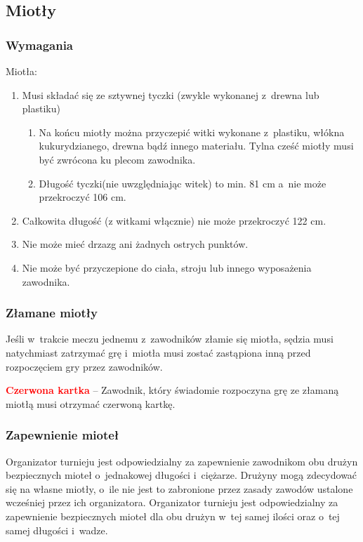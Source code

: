 \documentclass[12pt]{article}
\newcommand\redcard[1]{\bgroup\textcolor{red}{\textbf{#1}}}
\begin{document}
\subsection{Miotły}

\subsubsection{Wymagania}
Miotła:

\begin{enumerate}
	\item
	      Musi składać się ze sztywnej tyczki (zwykle wykonanej z~drewna lub
	      plastiku)

	      \begin{enumerate}
		      \item
		            Na końcu miotły można przyczepić witki wykonane z~plastiku, włókna
		            kukurydzianego, drewna bądź innego materiału. Tylna cześć miotły
		            musi być zwrócona ku plecom zawodnika.
		      \item
		            Długość tyczki(nie uwzględniając witek) to min. 81 cm a~nie może
		            przekroczyć 106 cm.
	      \end{enumerate}
	\item
	      Całkowita długość (z witkami włącznie) nie może przekroczyć 122 cm.
	\item
	      Nie może mieć drzazg ani żadnych ostrych punktów.
	\item
	      Nie może być przyczepione do ciała, stroju lub innego wyposażenia
	      zawodnika.
\end{enumerate}

\subsubsection{Złamane miotły}
Jeśli w~trakcie meczu jednemu z~zawodników złamie się miotła, sędzia musi natychmiast zatrzymać grę i~miotła musi zostać zastąpiona inną przed rozpoczęciem gry przez
zawodników.

\redcard{Czerwona kartka} -- Zawodnik, który świadomie rozpoczyna grę ze
złamaną miotłą musi otrzymać czerwoną kartkę.

\subsubsection{Zapewnienie mioteł}
Organizator turnieju jest odpowiedzialny za zapewnienie zawodnikom obu
drużyn bezpiecznych mioteł o~jednakowej długości i~ciężarze. Drużyny
mogą zdecydować się na własne miotły, o~ile nie jest to zabronione przez
zasady zawodów ustalone wcześniej przez ich organizatora. Organizator
turnieju jest odpowiedzialny za zapewnienie bezpiecznych mioteł dla obu
drużyn w~tej samej ilości oraz o~tej samej długości i~wadze.
\end{document}
